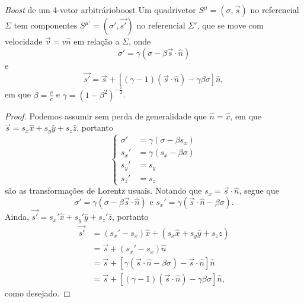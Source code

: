 \documentclass[12pt,a4paper]{article}
\numberwithin{equation}{section}
\begin{document}
\begin{proposition}{\textit{Boost} de um 4-vetor arbitrário}{boost}
    Um quadrivetor \(S^\mu = (\sigma, \vec{s})\) no referencial \(\Sigma\) tem componentes \(S^{\mu'} = (\sigma', \vec{s'})\) no referencial \(\Sigma'\), que se move com velocidade \(\vec{v} = v\hat{n}\) em relação a \(\Sigma\), onde
    \begin{equation*}
        \sigma' = \gamma (\sigma - \beta \vec{s} \cdot \hat{n})
    \end{equation*}
    e
    \begin{equation*}
        \vec{s'} = \vec{s} + \left[(\gamma - 1)(\vec{s} \cdot \hat{n}) - \gamma \beta \sigma\right]\hat{n},
    \end{equation*}
    em que \(\beta = \frac{v}{c}\) e \(\gamma = (1 - \beta^2)^{-\frac12}\).
\end{proposition}
\begin{proof}
    Podemos assumir sem perda de generalidade que \(\hat{n} = \hat{x}\), em que \(\vec{s} = s_x \hat{x} + s_y \hat{y} + s_z \hat{z}\), portanto
    \begin{equation*}
        \left\{
        \begin{aligned}
            \sigma' &= \gamma (\sigma - \beta s_x)\\
            s_x' &= \gamma (s_x - \beta \sigma)\\
            s_y' &= s_y\\
            s_z' &= s_z
        \end{aligned}
        \right.
    \end{equation*}
    são as transformações de Lorentz usuais. Notando que \(s_x = \vec{s}\cdot\hat{n}\), segue que
    \begin{equation*}
        \sigma' = \gamma (\sigma - \beta \vec{s} \cdot\hat{n})\text{ e }s_x' = \gamma (\vec{s} \cdot \hat{n} - \beta \sigma).
    \end{equation*}
    Ainda, \(\vec{s'} = s_x' \hat{x} + s_y' \hat{y} + s_z'\hat{z}\), portanto
    \begin{align*}
        \vec{s'} &= \left(s_x' - s_x\right) \hat{x} + \left(s_x \hat{x} + s_y \hat{y} + s_z \hat{z}\right)\\
                 &= \vec{s} + \left(s_x' - s_x\right) \hat{n}\\
                 &= \vec{s} + \left[\gamma (\vec{s} \cdot \hat{n} - \beta \sigma) - \vec{s}\cdot\hat{n}\right]\hat{n}\\
                 &= \vec{s} + \left[(\gamma - 1)(\vec{s}\cdot\hat{n}) - \gamma \beta \sigma\right]\hat{n},
    \end{align*}
    como desejado.
\end{proof}
\end{document}
